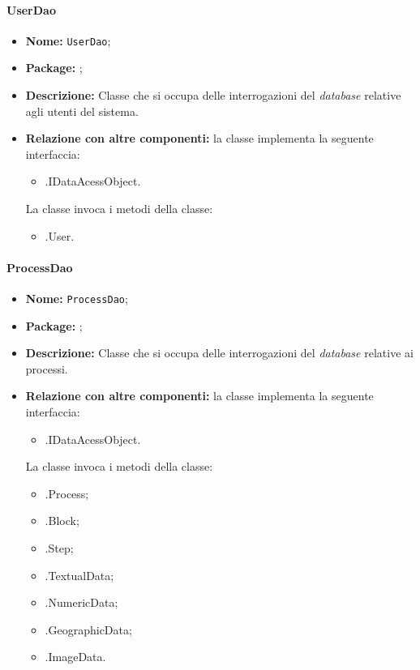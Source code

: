\paragraph{UserDao}
\begin{itemize}
\item \textbf{Nome:} \texttt{UserDao};
\item \textbf{Package:} \texttt{\smodel{}};
\item \textbf{Descrizione:} Classe che si occupa delle interrogazioni del \textit{database} relative agli utenti del sistema.
\item \textbf{Relazione con altre componenti:} la classe implementa la seguente interfaccia:
		\begin{itemize}
			\item \smodel{}.IDataAcessObject.
		\end{itemize}
		La classe invoca i metodi della classe:
		\begin{itemize}
			\item \smodel{}.User.
		\end{itemize}
\end{itemize}

\paragraph{ProcessDao}
\begin{itemize}
\item \textbf{Nome:} \texttt{ProcessDao};
\item \textbf{Package:} \texttt{\smodel{}};
\item \textbf{Descrizione:} Classe che si occupa delle interrogazioni del \textit{database} relative ai processi.
\item \textbf{Relazione con altre componenti:} la classe implementa la seguente interfaccia:
		\begin{itemize}
			\item \smodel{}.IDataAcessObject.
		\end{itemize}
		La classe invoca i metodi della classe:
		\begin{itemize}
			\item \smodel{}.Process;
			\item \smodel{}.Block;
			\item \smodel{}.Step;
			\item \smodel{}.TextualData;
			\item \smodel{}.NumericData;
			\item \smodel{}.GeographicData;
			\item \smodel{}.ImageData.
		\end{itemize}
\end{itemize}

